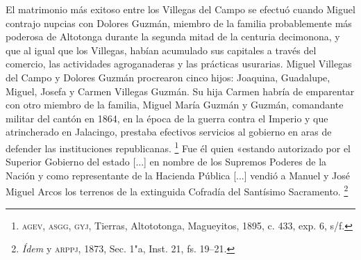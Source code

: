 \documentclass[14pt,twoside,final]{extbook} %
\let\oldfootnote\footnote
\renewcommand\footnote[1]{%
\oldfootnote{\hspace{1mm}#1}}
\begin{document}
El matrimonio más exitoso entre los Villegas del Campo se efectuó cuando Miguel contrajo nupcias con Dolores Guzmán, miembro de la familia probablemente más poderosa de Altotonga durante la segunda mitad de la centuria decimonona, y que al igual que los Villegas, habían acumulado sus capitales a través del comercio, las actividades agroganaderas y las prácticas usurarias. Miguel Villegas del Campo y Dolores Guzmán procrearon cinco hijos: Joaquina, Guadalupe, Miguel, Josefa y Carmen Villegas Guzmán. Su hija Carmen habría de emparentar con otro miembro de la familia, Miguel María Guzmán y Guzmán, comandante militar del cantón en 1864, en la época de la guerra contra el Imperio y que atrincherado en Jalacingo, prestaba efectivos servicios al gobierno en aras de defender las instituciones republicanas.\footnote{\textsc{agev, asgg, gyj}, Tierras, Altototonga, Magueyitos, 1895, c. 433, exp. 6, s/f.} Fue él quien «estando autorizado por el Superior Gobierno del estado [...] en nombre de los Supremos Poderes de la Nación y como representante de la Hacienda Pública [...] vendió a Manuel y José Miguel Arcos los terrenos de la extinguida Cofradía del Santísimo Sacramento.\footnote{\emph{Ídem} y \textsc{arppj}, 1873, Sec. 1"a, Inst. 21, fs. 19--21.}
\end{document}
